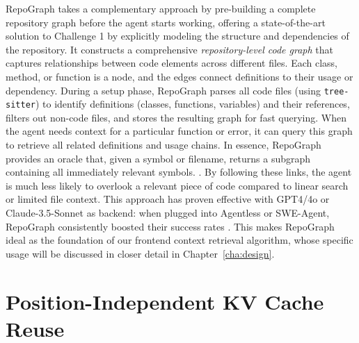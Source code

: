 RepoGraph \cite{ouyang2025repographenhancingaisoftware} takes a complementary approach by pre-building a complete repository graph before the agent starts working, offering a state-of-the-art solution to Challenge 1 by explicitly modeling the structure and dependencies of the repository. It constructs a comprehensive \emph{repository-level code graph} that captures relationships between code elements across different files. Each class, method, or function is a node, and the edges connect definitions to their usage or dependency. During a setup phase, RepoGraph parses all code files (using \texttt{tree-sitter}) to identify definitions (classes, functions, variables) and their references, filters out non-code files, and stores the resulting graph for fast querying. When the agent needs context for a particular function or error, it can query this graph to retrieve all related definitions and usage chains. In essence, RepoGraph provides an oracle that, given a symbol or filename, returns a subgraph containing all immediately relevant symbols. . By following these links, the agent is much less likely to overlook a relevant piece of code compared to linear search or limited file context. This approach has proven effective with GPT4/4o or Claude-3.5-Sonnet as backend: when plugged into Agentless or SWE-Agent, RepoGraph consistently boosted their success rates \cite{ouyang2025repographenhancingaisoftware}. This makes RepoGraph ideal as the foundation of our frontend context retrieval algorithm, whose specific usage will be discussed in closer detail in Chapter~\ref{cha:design}.


\section{Position-Independent KV Cache Reuse}
\label{sec:bg_kvcache}


